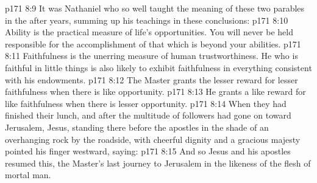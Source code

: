 \vs p171 8:9 It was Nathaniel who so well taught the meaning of these two parables in the after years, summing up his teachings in these conclusions:
\vs p171 8:10 \bibnobreakspace Ability is the practical measure of life’s opportunities. You will never be held responsible for the accomplishment of that which is beyond your abilities.
\vs p171 8:11 \bibnobreakspace Faithfulness is the unerring measure of human trustworthiness. He who is faithful in little things is also likely to exhibit faithfulness in everything consistent with his endowments.
\vs p171 8:12 \bibnobreakspace The Master grants the lesser reward for lesser faithfulness when there is like opportunity.
\vs p171 8:13 \bibnobreakspace He grants a like reward for like faithfulness when there is lesser opportunity.
\vs p171 8:14 \pc When they had finished their lunch, and after the multitude of followers had gone on toward Jerusalem, Jesus, standing there before the apostles in the shade of an overhanging rock by the roadside, with cheerful dignity and a gracious majesty pointed his finger westward, saying: 
\vs p171 8:15 And so Jesus and his apostles resumed this, the Master’s last journey to Jerusalem in the likeness of the flesh of mortal man.
\quizlink
